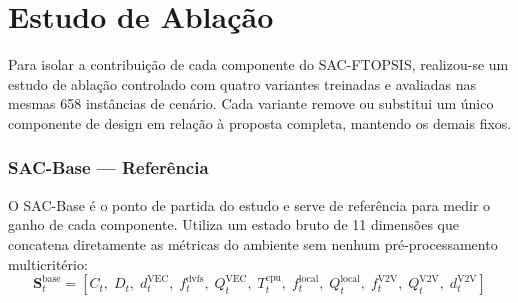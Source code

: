 \section{Estudo de Ablação}
\label{sec:ablacao}


Para isolar a contribuição de cada componente do \gls{SAC}-FTOPSIS, realizou-se um estudo de ablação controlado com quatro variantes treinadas e avaliadas nas mesmas 658 instâncias de cenário. Cada variante remove ou substitui um único componente de design em relação à proposta completa, mantendo os demais fixos.



\subsubsection*{SAC-Base — Referência}

O \gls{SAC}-Base é o ponto de partida do estudo e serve de referência para medir o ganho de cada componente. Utiliza um estado bruto de 11 dimensões que concatena diretamente as métricas do ambiente sem nenhum pré-processamento multicritério:
\begin{equation}
    \mathbf{S}^{\text{base}}_t = \left[
        C_t,\;
        D_t,\;
        d^{\text{VEC}}_t,\;
        f^{\text{dvfs}}_t,\;
        Q^{\text{VEC}}_t,\;
        T^{\text{cpu}}_t,\;
        f^{\text{local}}_t,\;
        Q^{\text{local}}_t,\;
        f^{\text{V2V}}_t,\;
        Q^{\text{V2V}}_t,\;
        d^{\text{V2V}}_t
    \right]
    \label{eq:estado-base}
\end{equation}


